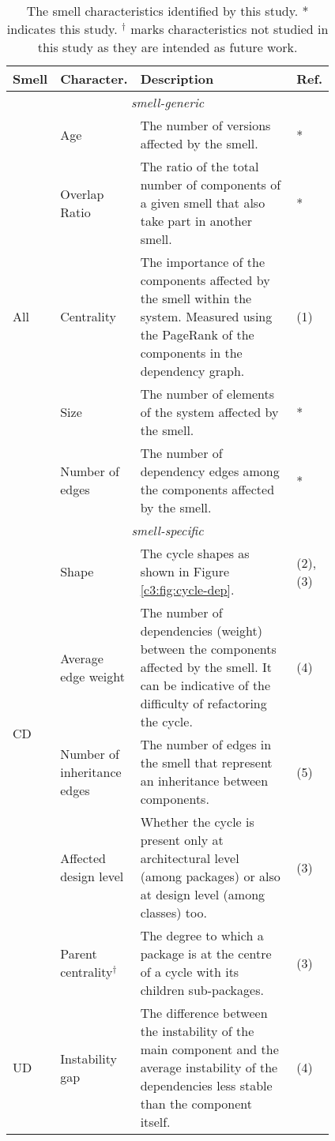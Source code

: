 \begin{table}[]
    \footnotesize
    \centering
    \caption{The smell characteristics identified by this study. * indicates this study. $^\dagger$ marks characteristics not studied in this study as they are intended as future work.}
    \label{tab:smell-characteristics}
    \begin{tabular}{p{0.035\linewidth}p{0.15\linewidth}p{0.60\linewidth}p{0.025\linewidth}}
    \toprule
    \textbf{Smell} & \textbf{Character.} & \textbf{Description} & \textbf{Ref.} \\ \midrule
    \multicolumn{4}{c}{\itshape smell-generic}\\\midrule
    \multirow{5}{*}{All} & Age & The number of versions affected by the smell. & * \\
     & Overlap Ratio & The ratio of the total number of components of a given smell that also take part in another smell. & * \\
     & Centrality & The importance of the components affected by the smell within the system. Measured using the PageRank of the components in the dependency graph. & (1) \\
     & Size & The number of elements of the system affected by the smell. & * \\
     & Number of edges & The number of dependency edges among the components affected by the smell. & * \\ \midrule
    \multicolumn{4}{c}{\itshape smell-specific}\\\midrule
    \multirow{4}{0.1\linewidth}{CD} & Shape & The cycle shapes as shown in Figure \ref{c3:fig:cycle-dep}. & (2), (3)\\
    & Average edge weight &  The number of dependencies (weight) between the components affected by the smell. It can be indicative of the difficulty of refactoring the cycle. & (4)\\
     & Number of inheritance edges & The number of edges in the smell that represent an inheritance between components. & (5) \\
     & Affected design level & Whether the cycle is present only at architectural level (among packages) or also at design level (among classes) too. & (3) \\
     & Parent centrality$^\dagger$ & The degree to which a package is at the centre of a cycle with its children sub-packages. & (3)\\ \midrule
     \multirow{2}{0.1\linewidth}{UD} & Instability gap & The difference between the instability of the main component and the average instability of the dependencies less stable than the component itself. & (4) \\

\end{tabular}
\end{table}
